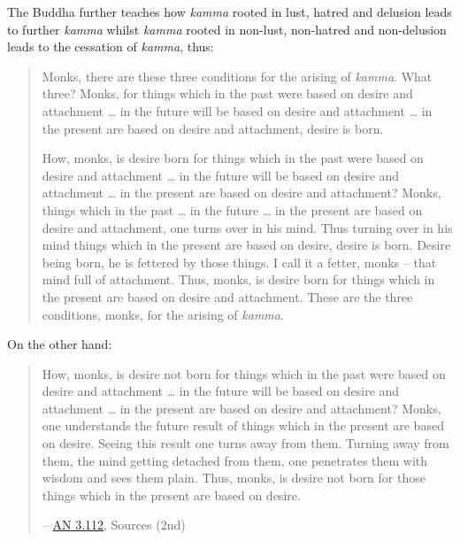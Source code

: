 The Buddha further teaches how \textit{kamma} rooted in lust, hatred and delusion leads to further \textit{kamma} whilst \textit{kamma} rooted in non-lust, non-hatred and non-delusion leads to the cessation of \textit{kamma}, thus:

\begin{quote}
Monks, there are these three conditions for the arising of \textit{kamma}. What three? Monks, for things which in the past were based on desire and attachment \ldots{} in the future will be based on desire and attachment \ldots{} in the present are based on desire and attachment, desire is born.

How, monks, is desire born for things which in the past were based on desire and attachment \ldots{} in the future will be based on desire and attachment \ldots{} in the present are based on desire and attachment? Monks, things which in the past \ldots{} in the future \ldots{} in the present are based on desire and attachment, one turns over in his mind. Thus turning over in his mind things which in the present are based on desire, desire is born. Desire being born, he is fettered by those things. I call it a fetter, monks -- that mind full of attachment. Thus, monks, is desire born for things which in the present are based on desire and attachment. These are the three conditions, monks, for the arising of \textit{kamma}.
\end{quote}

On the other hand:

\begin{quote}
How, monks, is desire not born for things which in the past were based on desire and attachment \ldots{} in the future will be based on desire and attachment \ldots{} in the present are based on desire and attachment? Monks, one understands the future result of things which in the present are based on desire. Seeing this result one turns away from them. Turning away from them, the mind getting detached from them, one penetrates them with wisdom and sees them plain. Thus, monks, is desire not born for those things which in the present are based on desire.

 -- \href{https://suttacentral.net/an3.112/en/sujato}{AN 3.112}, Sources (2nd)
\end{quote}
